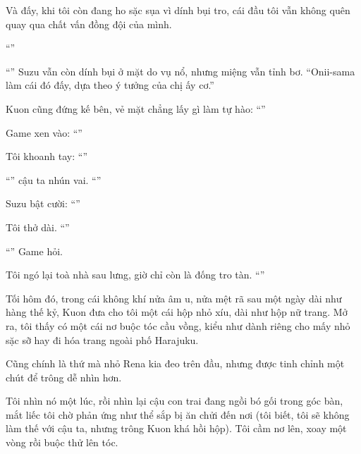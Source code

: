 \documentclass[../main.tex]{subfiles}
\begin{document}
Và đấy, khi tôi còn đang ho sặc sụa vì dính bụi tro, cái đầu tôi vẫn không quên quay qua chất vấn đồng đội của mình.

``''

``'' Suzu vẫn còn dính bụi ở mặt do vụ nổ, nhưng miệng vẫn tỉnh bơ. ``Onii-sama làm cái đó đấy, dựa theo ý tưởng của chị ấy cơ.''

Kuon cũng đứng kế bên, vẻ mặt chẳng lấy gì làm tự hào: ``''

Game xen vào: ``''

Tôi khoanh tay: ``''

``'' cậu ta nhún vai. ``''

Suzu bật cười: ``''

Tôi thở dài. ``''

``'' Game hỏi.

Tôi ngó lại toà nhà sau lưng, giờ chỉ còn là đống tro tàn. ``''
\omk

Tối hôm đó, trong cái không khí nửa âm u, nửa mệt rã sau một ngày dài như hàng thế kỷ, Kuon đưa cho tôi một cái hộp nhỏ xíu, dài như hộp nữ trang. Mở ra, tôi thấy có một cái nơ buộc tóc cầu vồng, kiểu như dành riêng cho mấy nhỏ sặc sỡ hay đi hóa trang ngoài phố Harajuku.

Cũng chính là thứ mà nhỏ Rena kia đeo trên đầu, nhưng được tinh chỉnh một chút để trông dễ nhìn hơn.

Tôi nhìn nó một lúc, rồi nhìn lại cậu con trai đang ngồi bó gối trong góc bàn, mắt liếc tôi chờ phản ứng như thể sắp bị ăn chửi đến nơi (tôi biết, tôi sẽ không làm thế với cậu ta, nhưng trông Kuon khá hồi hộp). Tôi cầm nơ lên, xoay một vòng rồi buộc thử lên tóc.
\end{document}
